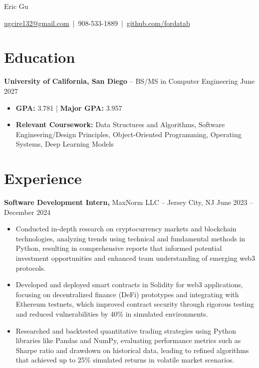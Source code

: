\documentclass[11pt]{article}       %
\begin{document}
\centerline{\Huge Eric Gu}

\vspace{-4pt}

\centerline{\href{mailto:ugcire132@gmail.com}{ugcire132@gmail.com} \,|\, 908-533-1889 \,|\, \href{https://github.com/fordatab}{github.com/fordatab}}


\vspace{-18.5pt}

\section*{Education}
\textbf{University of California, San Diego} -- BS/MS in Computer Engineering  \hfill June 2027\begin{itemize}[leftmargin=*, nosep]
    \item \textbf{GPA:} 3.781 | \textbf{Major GPA:} 3.957
    \item \textbf{Relevant Coursework:} Data Structures and Algorithms, Software Engineering/Design Principles, Object-Oriented Programming, Operating Systems, Deep Learning Models
\end{itemize}


\vspace{-18.5pt}

\section*{Experience}
\textbf{Software Development Intern,} {MaxNorm LLC} -- Jersey City, NJ \hfill June 2023 -- December 2024 \
\vspace{-9pt}
\begin{itemize}
\item Conducted in-depth research on cryptocurrency markets and blockchain technologies, analyzing trends using technical and fundamental methods in Python, resulting in comprehensive reports that informed potential investment opportunities and enhanced team understanding of emerging web3 protocols.
\item Developed and deployed smart contracts in Solidity for web3 applications, focusing on decentralized finance (DeFi) prototypes and integrating with Ethereum testnets, which improved contract security through rigorous testing and reduced vulnerabilities by 40\% in simulated environments.
\item Researched and backtested quantitative trading strategies using Python libraries like Pandas and NumPy, evaluating performance metrics such as Sharpe ratio and drawdown on historical data, leading to refined algorithms that achieved up to 25\% simulated returns in volatile market scenarios.
\end{itemize}
\end{document}
